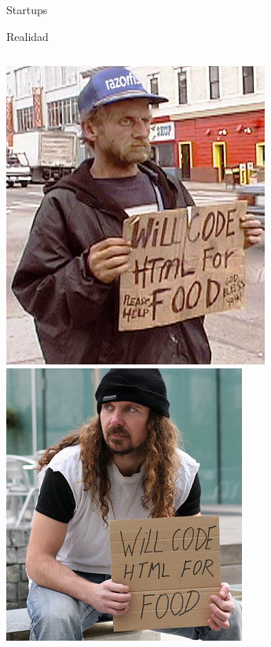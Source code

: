 \documentclass[14pt]{beamer}
\begin{document}
\begin{frame}{Startups}
    \begin{alertblock}{}
    \centering \Large Realidad
  \end{alertblock}

  \begin{columns}
      \includegraphics[width=0.4\paperwidth]{pics/code-for-food-one.jpg}
      \includegraphics[width=0.4\paperwidth]{pics/code-for-food-two.jpg}
  \end{columns}
\end{frame}
\end{document}
